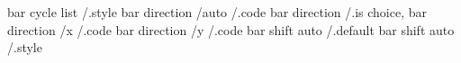 bar cycle list            /.style     
bar direction /auto       /.code
bar direction             /.is choice,
bar direction /x          /.code
bar direction /y          /.code
bar shift auto            /.default   
bar shift auto            /.style     


